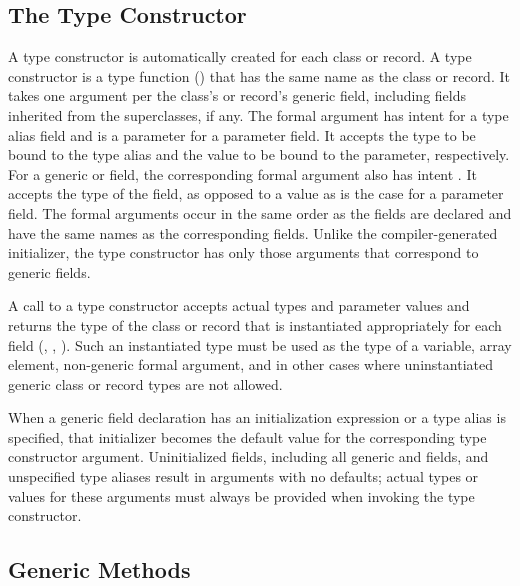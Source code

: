 \subsection{The Type Constructor}
\label{Type_Constructors}

A type constructor is automatically created for each class or record.
A type constructor is a type function () that has
the same name as the class or record.  It takes one argument per the
class's or record's generic field, including fields inherited from the
superclasses, if any.
The formal argument has intent  for a type alias field and is a
parameter for a parameter field. It accepts the type to be bound
to the type alias and the value to be bound to the parameter, respectively.
For a generic  or  field, the corresponding
formal argument also has intent . It accepts the type
of the field, as opposed to a value as is the case for a parameter field.
The formal arguments occur in the same order as the fields are
declared and have the same names as the corresponding fields.
Unlike the compiler-generated initializer, the type constructor has only
those arguments that correspond to generic fields.

A call to a type constructor accepts actual types and parameter values
and returns the type of the class or record that is instantiated
appropriately for each field
(, ,
).
Such an instantiated type must be used as the type of a variable,
array element, non-generic formal argument, and in other cases
where uninstantiated generic class or record types are not allowed.

When a generic field declaration has an initialization expression
or a type alias is specified, that initializer becomes the default value
for the corresponding type constructor argument.  Uninitialized
fields, including all generic  and  fields,
and unspecified type aliases result in arguments with no defaults;
actual types or values for these arguments must always be provided
when invoking the type constructor.

\subsection{Generic Methods}
\label{Generic_Methods}

